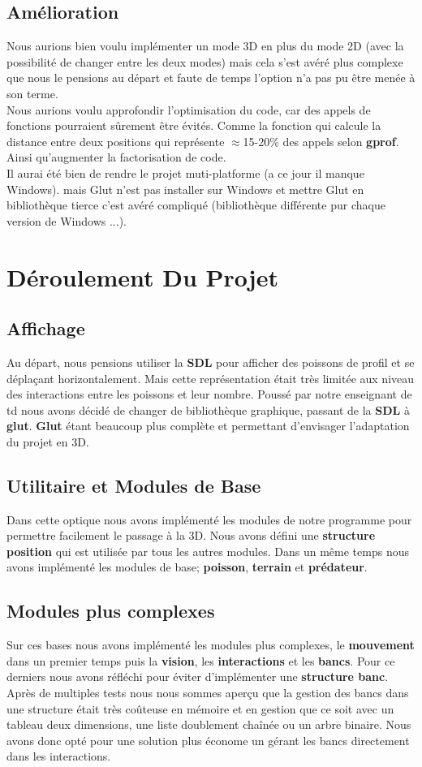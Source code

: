\documentclass{article}
\begin{document}
\subsection{Amélioration}
Nous aurions bien voulu implémenter un mode 3D en plus du mode 2D (avec la possibilité de changer entre les deux modes) mais cela s'est avéré plus complexe que nous le pensions au départ et faute de temps l'option n'a pas pu être menée à son terme.
\\Nous aurions voulu approfondir l'optimisation du code, car des appels de fonctions pourraient sûrement être évités. Comme la fonction qui calcule la distance entre deux positions qui représente $\approx$15-20\% des appels selon \textbf{gprof}. Ainsi qu'augmenter la factorisation de code.
\\ Il aurai été bien de rendre le projet muti-platforme (a ce jour il manque Windows). mais  Glut n'est pas installer sur Windows et mettre Glut en bibliothèque tierce c'est avéré  compliqué (bibliothèque différente pur chaque version de Windows ...).


\section{Déroulement Du Projet}
\label{deroulementduprojet}
\subsection{Affichage}
Au départ, nous pensions utiliser la \textbf{SDL} pour afficher des poissons de profil et se déplaçant horizontalement. Mais cette représentation était très limitée aux niveau des interactions entre les poissons et leur nombre.
Poussé par notre enseignant de td nous avons décidé de changer de bibliothèque graphique, passant de la \textbf{SDL} à \textbf{glut}. \textbf{Glut} étant beaucoup  plus complète et permettant d'envisager l'adaptation du projet en 3D.

\subsection{Utilitaire et Modules de Base}
Dans cette optique nous avons implémenté les modules de notre programme pour permettre facilement le passage à la 3D. 
Nous avons défini une \textbf{structure position} qui est utilisée par tous les autres modules. Dans un même temps nous avons implémenté les modules de base; \textbf{poisson}, \textbf{terrain} et \textbf{prédateur}.
\subsection{Modules plus complexes}
Sur ces bases nous avons implémenté les modules plus complexes, le \textbf{mouvement} dans un premier temps puis la \textbf{vision}, les \textbf{interactions} et les \textbf{bancs}. Pour ce derniers nous avons réfléchi pour éviter d’implémenter une \textbf{structure banc}. Après de multiples tests nous nous sommes aperçu que la gestion des bancs dans une structure était très coûteuse en mémoire et en gestion que ce soit avec un tableau deux dimensions, une liste doublement chaînée ou un arbre binaire. Nous avons donc opté pour une solution plus économe un gérant les bancs directement dans les interactions.
\end{document}
